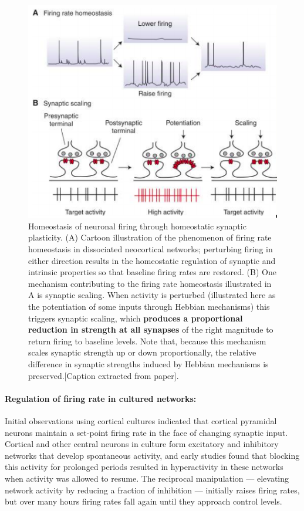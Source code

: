 \documentclass[main]{subfiles}
\begin{document}
\begin{figure}[H]
    \centering
    \includegraphics[width=.7\textwidth]{03_PlasticityInTheBrain/figures/pasted_image_4.png}
    \caption{Homeostasis of neuronal firing through homeostatic synaptic plasticity. (A) Cartoon illustration of the phenomenon of firing rate homeostasis in dissociated neocortical networks; perturbing firing in either direction results in the homeostatic regulation of synaptic and intrinsic properties so that baseline firing rates are restored. (B) One mechanism contributing to the firing rate homeostasis illustrated in A is synaptic scaling. When activity is perturbed (illustrated here as the potentiation of some inputs through Hebbian mechanisms) this triggers synaptic scaling, which \textbf{produces a proportional reduction in strength at all synapses} of the right magnitude to return firing to baseline levels. Note that, because this mechanism scales synaptic strength up or down proportionally, the relative difference in synaptic strengths induced by Hebbian mechanisms is preserved.[Caption extracted from paper].}
    \label{fig:firing_rate_regulation}
\end{figure}

\paragraph{Regulation of firing rate in cultured networks:} Initial observations using cortical cultures indicated that cortical pyramidal neurons maintain a set-point firing rate in the face of changing synaptic input. Cortical and other central neurons in culture form excitatory and inhibitory networks that develop spontaneous activity, and early studies found that blocking this activity for prolonged periods resulted in hyperactivity in these networks when activity was allowed to resume. The reciprocal manipulation — elevating network activity by reducing a fraction of inhibition — initially raises firing rates, but over many hours firing rates fall again until they approach control levels.
\end{document}
